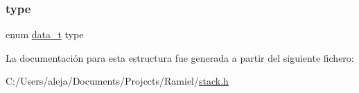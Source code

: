 \mbox{\label{structstack__item_a0c6169f5c94682132bbbe974784559e6}} 
\subsubsection{\texorpdfstring{type}{type}}
{\footnotesize\ttfamily enum \mbox{\hyperlink{hashtable_8h_adb5f3584b941a8dc0fed6b7302b4b8eb}{data\+\_\+t}} type}



La documentación para esta estructura fue generada a partir del siguiente fichero\+:\begin{DoxyCompactItemize}
\item 
C\+:/\+Users/aleja/\+Documents/\+Projects/\+Ramiel/\mbox{\hyperlink{stack_8h}{stack.\+h}}\end{DoxyCompactItemize}
